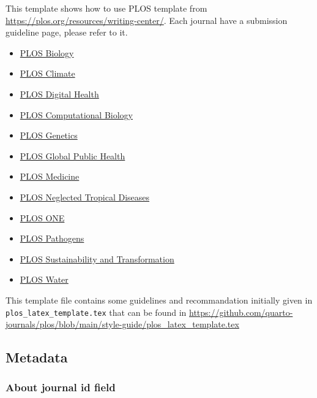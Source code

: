 \documentclass[
  10pt,
  letterpaper,
]{article}
\providecommand{\tightlist}{%
  \setlength{\itemsep}{0pt}\setlength{\parskip}{0pt}}\usepackage{longtable,booktabs,array}
\begin{document}
This template shows how to use PLOS template from
\url{https://plos.org/resources/writing-center/}. Each journal have a
submission guideline page, please refer to it.

\begin{itemize}
\tightlist
\item
  \href{https://journals.plos.org/plosbiology/s/submission-guidelines}{PLOS
  Biology}
\item
  \href{https://journals.plos.org/climate/s/submission-guidelines}{PLOS
  Climate}
\item
  \href{https://journals.plos.org/digitalhealth/s/submission-guidelines}{PLOS
  Digital Health}
\item
  \href{https://journals.plos.org/ploscompbiol/s/submission-guidelines}{PLOS
  Computational Biology}
\item
  \href{https://journals.plos.org/plosgenetics/s/submission-guidelines}{PLOS
  Genetics}
\item
  \href{https://journals.plos.org/globalpublichealth/s/submission-guidelines}{PLOS
  Global Public Health}
\item
  \href{https://journals.plos.org/plosmedicine/s/submission-guidelines}{PLOS
  Medicine}
\item
  \href{https://journals.plos.org/plosntds/s/submission-guidelines}{PLOS
  Neglected Tropical Diseases}
\item
  \href{https://journals.plos.org/plosone/s/submission-guidelines}{PLOS
  ONE}
\item
  \href{https://journals.plos.org/plospathogens/s/submission-guidelines}{PLOS
  Pathogens}
\item
  \href{https://journals.plos.org/sustainabilitytransformation/s/submission-guidelines}{PLOS
  Sustainability and Transformation}
\item
  \href{https://journals.plos.org/water/s/submission-guidelines}{PLOS
  Water}
\end{itemize}

This template file contains some guidelines and recommandation initially
given in \texttt{plos\_latex\_template.tex} that can be found in
\url{https://github.com/quarto-journals/plos/blob/main/style-guide/plos_latex_template.tex}

\hypertarget{metadata}{%
\subsection{Metadata}\label{metadata}}

\hypertarget{about-journal-id-field}{%
\subsubsection{About journal id field}\label{about-journal-id-field}}
\end{document}
